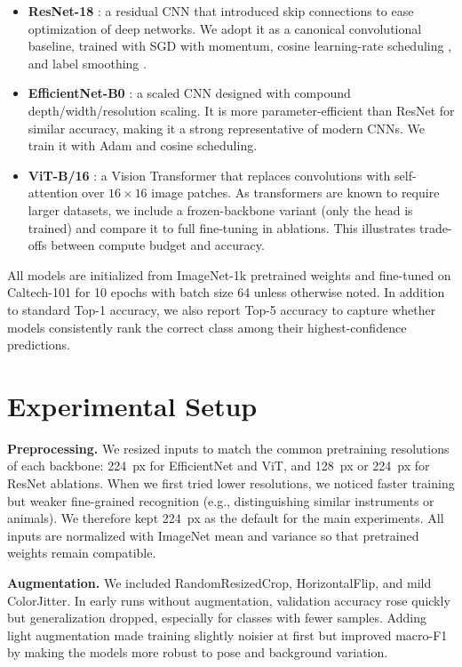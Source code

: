 \documentclass[11pt]{article}
\begin{document}
\begin{itemize}[leftmargin=*]
  \item \textbf{ResNet-18} \cite{He2016}: a residual CNN that introduced skip connections to ease optimization of deep networks. 
  We adopt it as a canonical convolutional baseline, trained with SGD with momentum, cosine learning-rate scheduling \cite{Loshchilov2017}, and label smoothing \cite{Szegedy2016}. 
  
  \item \textbf{EfficientNet-B0} \cite{Tan2019}: a scaled CNN designed with compound depth/width/resolution scaling. 
  It is more parameter-efficient than ResNet for similar accuracy, making it a strong representative of modern CNNs. 
  We train it with Adam \cite{Kingma2015} and cosine scheduling. 
  
  \item \textbf{ViT-B/16} \cite{Dosovitskiy2021}: a Vision Transformer that replaces convolutions with self-attention over $16 \times 16$ image patches. 
  As transformers are known to require larger datasets, we include a frozen-backbone variant (only the head is trained) and compare it to full fine-tuning in ablations. 
  This illustrates trade-offs between compute budget and accuracy.
\end{itemize}

All models are initialized from ImageNet-1k pretrained weights and fine-tuned on Caltech-101 for 10 epochs with batch size 64 unless otherwise noted. 
In addition to standard Top-1 accuracy, we also report Top-5 accuracy to capture whether models consistently rank the correct class among their highest-confidence predictions.

\section{Experimental Setup}

\textbf{Preprocessing.} 
We resized inputs to match the common pretraining resolutions of each backbone: \SI{224}{px} for EfficientNet and ViT, and \SI{128}{px} or \SI{224}{px} for ResNet ablations. 
When we first tried lower resolutions, we noticed faster training but weaker fine-grained recognition (e.g., distinguishing similar instruments or animals). 
We therefore kept \SI{224}{px} as the default for the main experiments. 
All inputs are normalized with ImageNet mean and variance so that pretrained weights remain compatible.

\textbf{Augmentation.} 
We included RandomResizedCrop, HorizontalFlip, and mild ColorJitter. 
In early runs without augmentation, validation accuracy rose quickly but generalization dropped, especially for classes with fewer samples. 
Adding light augmentation made training slightly noisier at first but improved macro-F1 by making the models more robust to pose and background variation.
\end{document}
